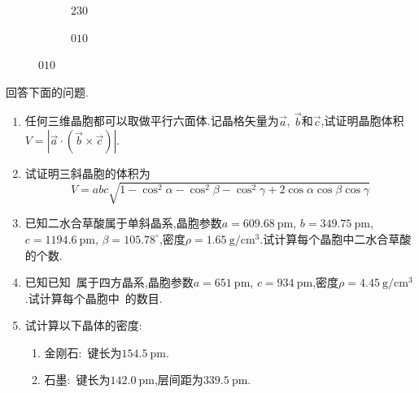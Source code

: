 \documentclass{ctexart}
\begin{document}
\begin{solution}
\begin{figure}[H]
\begin{subfigure}[b]{.3\linewidth}
            \caption{$230$}
        \end{subfigure}
        \begin{subfigure}[b]{.3\linewidth}\centering
            \caption{$010$}
        \end{subfigure}
    \end{figure}
\end{solution}
\begin{homework}[9.]
    回答下面的问题.
    \begin{enumerate}[label=\tbf{(\alph*)}]
        \item 任何三维晶胞都可以取做平行六面体.记晶格矢量为$\vec{a}$, $\vec{b}$和$\vec{c}$,试证明晶胞体积$V=\left|\vec{a}\cdot(\vec{b}\times\vec{c})\right|$.
        \item 试证明三斜晶胞的体积为
        \[V=abc\sqrt{1-\cos^2\alpha-\cos^2\beta-\cos^2\gamma+2\cos\alpha\cos\beta\cos\gamma}\]
        \item 已知二水合草酸属于单斜晶系,晶胞参数$a=\SI{609.68}{\pico\meter}$, $b=\SI{349.75}{\pico\meter}$, $c=\SI{1194.6}{\pico\meter}$, $\beta=105.78^\circ$,密度$\rho=\SI{1.65}{\gram\per\centi\meter^3}$.试计算每个晶胞中二水合草酸的个数.
        \item 已知已知~属于四方晶系,晶胞参数$a=\SI{651}{\pico\meter}$, $c=\SI{934}{\pico\meter}$,密度$\rho=\SI{4.45}{\gram\per\centi\meter^3}$.试计算每个晶胞中~的数目.
        \item 试计算以下晶体的密度:\begin{enumerate}[label=\tbf{(\roman*)}]
            \item 金刚石:~键长为$\SI{154.5}{\pico\meter}$.
            \item 石墨:~键长为$\SI{142.0}{\pico\meter}$,层间距为$\SI{339.5}{\pico\meter}$.
        \end{enumerate}
    \end{enumerate}
\end{homework}
\end{document}
